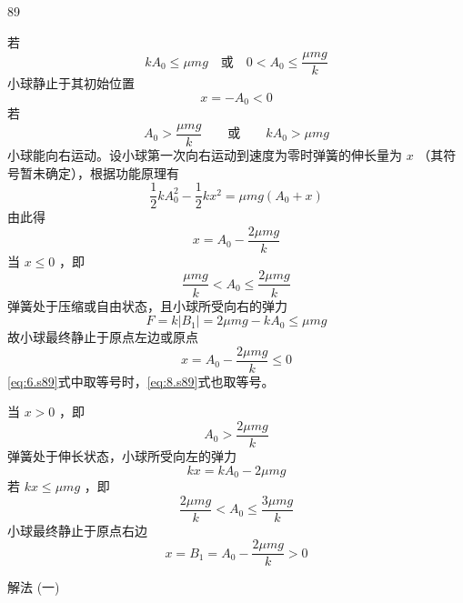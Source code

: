 \begin{solution}{89}
\begin{subsolution}
若
\begin{equation}
k A _ {0} \leq \mu m g \quad \text {或} \quad 0 <   A _ {0} \leq \frac {\mu m g}{k}
\label{eq:1.s89}
\end{equation}
小球静止于其初始位置
\begin{equation}
x = - A _ {0} <   0
\label{eq:2.s89}
\end{equation}
若
\begin{equation}
A _ {0} > \frac {\mu m g}{k} \qquad \text {或} \qquad k A _ {0} > \mu m g
\label{eq:3.s89}
\end{equation}
小球能向右运动。设小球第一次向右运动到速度为零时弹簧的伸长量为 $x$ （其符号暂未确定），根据功能原理有
\begin{equation}
\frac {1}{2} k A _ {0} ^ {2} - \frac {1}{2} k x ^ {2} = \mu m g (A _ {0} + x)
\label{eq:4.s89}
\end{equation}
由此得
\begin{equation}
x = A _ {0} - \frac {2 \mu m g}{k}
\label{eq:5.s89}
\end{equation}
当 $x \leq 0$ ，即
\begin{equation}
\frac {\mu m g}{k} <   A _ {0} \leq \frac {2 \mu m g}{k}
\label{eq:6.s89}
\end{equation}
弹簧处于压缩或自由状态，且小球所受向右的弹力
\begin{equation}
F = k \left| B _ {1} \right| = 2 \mu m g - k A _ {0} \leq \mu m g
\label{eq:7.s89}
\end{equation}
故小球最终静止于原点左边或原点
\begin{equation}
x = A _ {0} - \frac {2 \mu m g}{k} \leq 0
\label{eq:8.s89}
\end{equation}
\eqref{eq:6.s89}式中取等号时，\eqref{eq:8.s89}式也取等号。

当 $x > 0$ ，即
\begin{equation}
A _ {0} > \frac {2 \mu m g}{k}
\label{eq:9.s89}
\end{equation}
弹簧处于伸长状态，小球所受向左的弹力
\begin{equation}
k x = k A _ {0} - 2 \mu m g
\label{eq:10.s89}
\end{equation}
若 $kx \leq \mu mg$ ，即
\begin{equation}
\frac {2 \mu m g}{k} <   A _ {0} \leq \frac {3 \mu m g}{k}
\label{eq:11.s89}
\end{equation}
小球最终静止于原点右边
\begin{equation}
x = B _ {1} = A _ {0} - \frac {2 \mu m g}{k} > 0
\label{eq:12.s89}
\end{equation}
\end{subsolution}
\begin{subsolution}
解法 (一)


\end{subsolution}
\end{solution}
